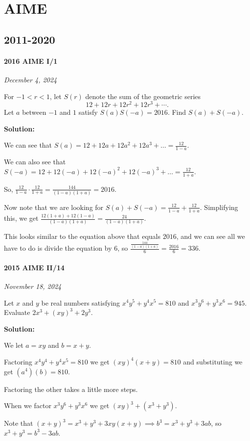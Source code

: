 \documentclass[../mathproblems.tex]{subfiles}
\begin{document}
\chapter{AIME}
\section{2011-2020}
\subsubsection*{2016 AIME I/1} 
\textit{December 4, 2024}

For $-1<r<1$, let $S(r)$ denote the sum of the geometric series \[12+12r+12r^2+12r^3+\cdots .\]Let $a$ between $-1$ and $1$ satisfy $S(a)S(-a)=2016$. Find $S(a)+S(-a)$.

\textbf{Solution:}

We can see that $S(a) = 12+12a+12a^2+12a^3+\dots = \frac{12}{1-a}$.

We can also see that $S(-a)=12+12(-a)+12(-a)^2+12(-a)^3+\dots = \frac{12}{1+a}$.

So, $\frac{12}{1-a}\cdot \frac{12}{1+a}=\frac{144}{(1-a)(1+a)} = 2016$.

Now note that we are looking for $S(a)+S(-a) = \frac{12}{1-a}+\frac{12}{1+a}$. Simplifying this, we get $\frac{12(1+a)+12(1-a)}{(1-a)(1+a)} = \frac{24}{(1-a)(1+a)}$.

This looks similar to the equation above that equals $2016$, and we can see all we have to do is divide the equation by $6$, so $\frac{\frac{144}{(1-a)(1+a)}}{6} = \frac{2016}{6} = \boxed{336}$.

\noindent\hrulefill
\subsubsection*{2015 AIME II/14} 
\textit{November 18, 2024}

Let $x$ and $y$ be real numbers satisfying $x^4y^5+y^4x^5=810$ and $x^3y^6+y^3x^6=945$. Evaluate $2x^3+(xy)^3+2y^3$.

\textbf{Solution:}

We let $a=xy$ and $b=x+y$.

Factoring $x^4y^4+y^4x^5=810$ we get $(xy)^4(x+y)=810$ and substituting we get $(a^4)(b)=810$.

Factoring the other takes a little more steps.

When we factor $x^3y^6+y^3x^6$ we get $(xy)^3+(x^3+y^3)$.

Note that $(x+y)^3=x^3+y^3+3xy(x+y) \implies b^3=x^3+y^3+3ab$, so $x^3+y^3 = b^3-3ab$.
\end{document}
